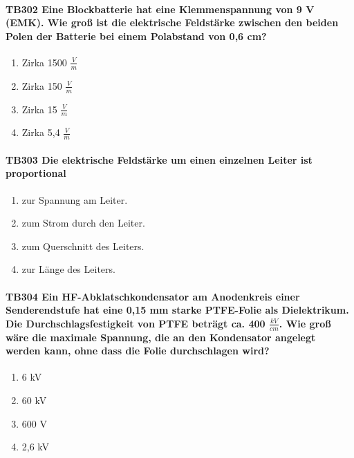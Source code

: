 \documentclass[8pt]{article}
\begin{document}
\begin{enumerate}
\paragraph*{TB302 Eine Blockbatterie hat eine Klemmenspannung von 9 V (EMK). Wie groß ist die elektrische Feldstärke zwischen den beiden Polen der Batterie bei einem Polabstand von 0,6 cm?}
\begin{enumerate}[nolistsep,label=\Alph*]
\item Zirka 1500 $\frac{V}{m}$
\item Zirka 150 $\frac{V}{m}$
\item Zirka 15 $\frac{V}{m}$
\item Zirka 5,4 $\frac{V}{m}$
\end{enumerate}



\paragraph*{TB303 Die elektrische Feldstärke um einen einzelnen Leiter ist proportional} 
\begin{enumerate}[nolistsep,label=\Alph*]
\item zur Spannung am Leiter.
\item zum Strom durch den Leiter.
\item zum Querschnitt des Leiters.
\item zur Länge des Leiters.
\end{enumerate}



\paragraph*{TB304 Ein HF-Abklatschkondensator am Anodenkreis einer Senderendstufe hat eine 0,15 mm starke PTFE-Folie als Dielektrikum. Die Durchschlagsfestigkeit von PTFE beträgt ca. 400 $\frac{kV}{cm}$. Wie groß wäre die maximale Spannung, die an den Kondensator angelegt werden kann, ohne dass die Folie durchschlagen wird?}
\begin{enumerate}[nolistsep,label=\Alph*]
\item 6 kV
\item 60 kV
\item 600 V
\item 2,6 kV
\end{enumerate}




\end{enumerate}
\end{document}
